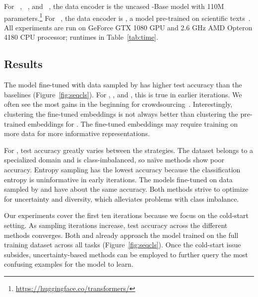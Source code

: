For ~\citep{maas-2011}, ~\citep{socher-2013}, and \agnews~\citep{zhang-2015}, the data encoder is the uncased \bert{}-Base model with 110M
parameters.\footnote{\url{https://huggingface.co/transformers/}}
For \pubmed~\citep{dernoncourt-2017}, the data encoder is \scibert, a \bert{} model pre-trained on scientific
texts~\citep{beltagy-2019}.  All experiments are run on GeForce GTX 1080 GPU and
2.6 GHz AMD Opteron 4180 CPU processor; runtimes in Table~\ref{tab:time}.




\subsection{Results}

The model fine-tuned with data sampled by \alps{} has
higher test accuracy than the baselines (Figure~\ref{fig:seqcls}).
For \agnews{}, , and \sst{},
this is true in earlier iterations.  We often see the
most gains in the beginning for
crowdsourcing~\citep{felt-2015}.  Interestingly,
clustering the fine-tuned \bert{} embeddings is not always better than
clustering the pre-trained \bert{} embeddings for .
The fine-tuned \bert{} embeddings may require training on more data for more
informative
representations.

For \pubmed, test accuracy greatly varies between the strategies.
The dataset belongs to a specialized domain and is class-imbalanced, so na\"ive
methods show poor accuracy.  Entropy
sampling has the lowest accuracy because the classification entropy is
uninformative in early iterations.
The models
fine-tuned on data sampled by \alps{} and \badge{} have about the same accuracy.
Both methods strive to optimize for uncertainty and diversity, which
alleviates problems with class imbalance.

Our experiments cover the first ten iterations because we focus on the
cold-start setting.  As sampling iterations increase, test accuracy across the
different methods converges.  Both \alps{} and \badge{} already approach the
model trained on the full training dataset across all tasks
(Figure~\ref{fig:seqcls}).  Once the cold-start issue subsides,
uncertainty-based methods can be employed to further query the most
confusing examples for the model to learn.


